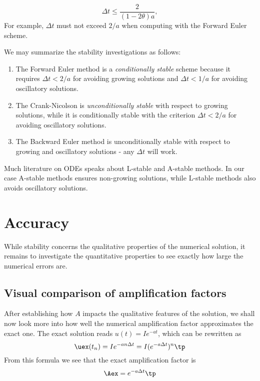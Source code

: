 \documentclass[graybox,sectrefs,envcountresetchap,open=right,final]{svmonodo}
\newenvironment{notice_mdfboxadmon}[1][]{
\begin{notice_mdfboxmdframed}[frametitle=#1]
}
{
\end{notice_mdfboxmdframed}
}
\begin{document}
\begin{equation}
\Delta t \leq \frac{2}{(1-2\theta)a},
\end{equation}
For example, $\Delta t$ must not exceed  $2/a$ when computing with
the Forward Euler scheme.



\begin{notice_mdfboxadmon}
We may summarize the stability investigations as follows:

\begin{enumerate}
\item The Forward Euler method is a \emph{conditionally stable} scheme because
   it requires $\Delta t < 2/a$ for avoiding growing solutions
   and $\Delta t < 1/a$ for avoiding oscillatory solutions.

\item The Crank-Nicolson is \emph{unconditionally stable} with respect to
   growing solutions, while it is conditionally stable with
   the criterion $\Delta t < 2/a$ for avoiding oscillatory solutions.

\item The Backward Euler method is unconditionally stable with respect
   to growing and oscillatory solutions - any $\Delta t$ will work.
\end{enumerate}

\noindent
Much literature on ODEs speaks about L-stable and A-stable methods.
In our case A-stable methods ensures non-growing solutions, while
L-stable methods also avoids oscillatory solutions.
\end{notice_mdfboxadmon}



\section{Accuracy}

While stability concerns the qualitative properties of the numerical
solution, it remains to investigate the quantitative properties to
see exactly how large the numerical errors are.

\subsection{Visual comparison of amplification factors}

After establishing how $A$ impacts the qualitative features of the
solution, we shall now look more into how well the numerical amplification
factor approximates the exact one. The exact solution reads
$u(t)=Ie^{-at}$, which can be rewritten as
\begin{equation}
{\uex}(t_n) = Ie^{-a n\Delta t} = I(e^{-a\Delta t})^n \tp
\end{equation}
From this formula we see that the exact amplification factor is
\begin{equation}
\Aex = e^{-a\Delta t} \tp
\end{equation}
\end{document}
